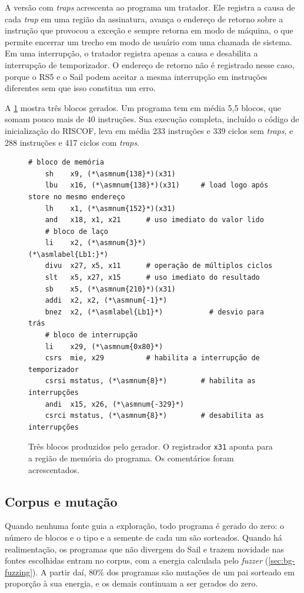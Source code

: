 A versão com \textit{traps} acrescenta ao programa um tratador. Ele registra a causa de cada \textit{trap} em uma região da assinatura, avança o endereço de retorno sobre a instrução que provocou a exceção e sempre retorna em modo de máquina, o que permite encerrar um trecho em modo de usuário com uma chamada de sistema. Em uma interrupção, o tratador registra apenas a causa e desabilita a interrupção de temporizador. O endereço de retorno não é registrado nesse caso, porque o RS5 e o Sail podem aceitar a mesma interrupção em instruções diferentes sem que isso constitua um erro.

A \cref{fig:exemplo-blocos} mostra três blocos gerados. Um programa tem em média 5,5 blocos, que somam pouco mais de 40 instruções. Sua execução completa, incluído o código de inicialização do RISCOF, leva em média 233 instruções e 339 ciclos sem \textit{traps}, e 288 instruções e 417 ciclos com \textit{traps}.

\begin{figure}[htb]
\small
\begin{lstlisting}[style=vscodelight]
    # bloco de memória
    sh    x9, (*\asmnum{138}*)(x31)
    lbu   x16, (*\asmnum{138}*)(x31)     # load logo após store no mesmo endereço
    lh    x1, (*\asmnum{152}*)(x31)
    and   x18, x1, x21      # uso imediato do valor lido
    # bloco de laço
    li    x2, (*\asmnum{3}*)
(*\asmlabel{Lb1:}*)
    divu  x27, x5, x11      # operação de múltiplos ciclos
    slt   x5, x27, x15      # uso imediato do resultado
    sb    x5, (*\asmnum{210}*)(x31)
    addi  x2, x2, (*\asmnum{-1}*)
    bnez  x2, (*\asmlabel{Lb1}*)           # desvio para trás
    # bloco de interrupção
    li    x29, (*\asmnum{0x80}*)
    csrs  mie, x29          # habilita a interrupção de temporizador
    csrsi mstatus, (*\asmnum{8}*)        # habilita as interrupções
    andi  x15, x26, (*\asmnum{-329}*)
    csrci mstatus, (*\asmnum{8}*)        # desabilita as interrupções
\end{lstlisting}
    \caption{Três blocos produzidos pelo gerador. O registrador \texttt{x31} aponta para a região de memória do programa. Os comentários foram acrescentados.}
    \label{fig:exemplo-blocos}
\end{figure}

\subsection{Corpus e mutação}\label{sec:previo-gerador-mutacao}

Quando nenhuma fonte guia a exploração, todo programa é gerado do zero: o número de blocos e o tipo e a semente de cada um são sorteados. Quando há realimentação, os programas que não divergem do Sail e trazem novidade nas fontes escolhidas entram no corpus, com a energia calculada pelo \textit{fuzzer} (\cref{sec:bg-fuzzing}). A partir daí, 80\% dos programas são mutações de um pai sorteado em proporção à sua energia, e os demais continuam a ser gerados do zero.

